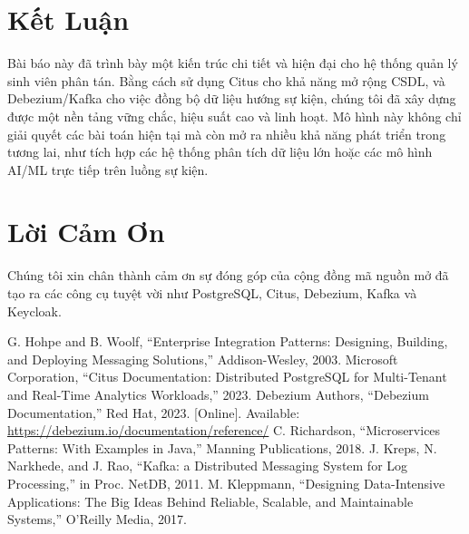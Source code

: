 \documentclass[conference]{IEEEtran}
\begin{document}
\section{Kết Luận}
Bài báo này đã trình bày một kiến trúc chi tiết và hiện đại cho hệ thống quản lý sinh viên phân tán. Bằng cách sử dụng Citus cho khả năng mở rộng CSDL, và Debezium/Kafka cho việc đồng bộ dữ liệu hướng sự kiện, chúng tôi đã xây dựng được một nền tảng vững chắc, hiệu suất cao và linh hoạt. Mô hình này không chỉ giải quyết các bài toán hiện tại mà còn mở ra nhiều khả năng phát triển trong tương lai, như tích hợp các hệ thống phân tích dữ liệu lớn hoặc các mô hình AI/ML trực tiếp trên luồng sự kiện.

\section*{Lời Cảm Ơn}
Chúng tôi xin chân thành cảm ơn sự đóng góp của cộng đồng mã nguồn mở đã tạo ra các công cụ tuyệt vời như PostgreSQL, Citus, Debezium, Kafka và Keycloak.

\begin{thebibliography}{00}
 G. Hohpe and B. Woolf, ``Enterprise Integration Patterns: Designing, Building, and Deploying Messaging Solutions,'' Addison-Wesley, 2003.
 Microsoft Corporation, ``Citus Documentation: Distributed PostgreSQL for Multi-Tenant and Real-Time Analytics Workloads,'' 2023.
 Debezium Authors, ``Debezium Documentation,'' Red Hat, 2023. [Online]. Available: \url{https://debezium.io/documentation/reference/}
 C. Richardson, ``Microservices Patterns: With Examples in Java,'' Manning Publications, 2018.
 J. Kreps, N. Narkhede, and J. Rao, ``Kafka: a Distributed Messaging System for Log Processing,'' in Proc. NetDB, 2011.
 M. Kleppmann, ``Designing Data-Intensive Applications: The Big Ideas Behind Reliable, Scalable, and Maintainable Systems,'' O'Reilly Media, 2017.
\end{thebibliography}
\end{document}
